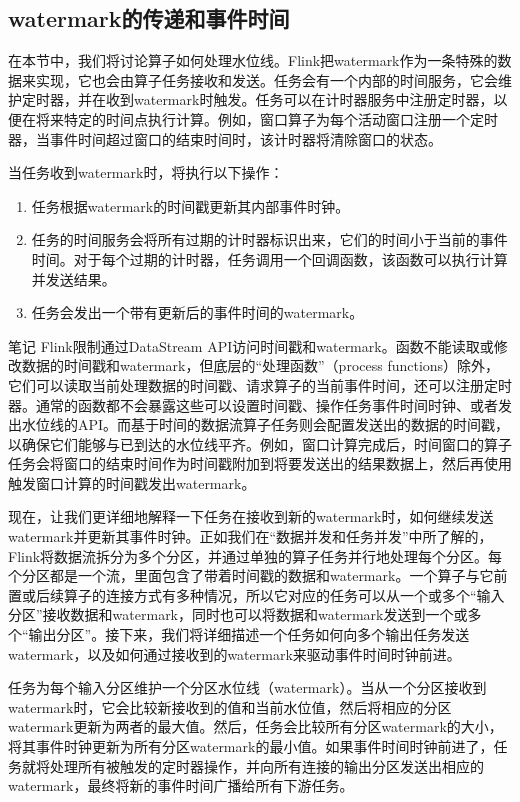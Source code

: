 \documentclass[oneside]{ctexbook}
\begin{document}
\subsection{watermark的传递和事件时间}

在本节中，我们将讨论算子如何处理水位线。Flink把watermark作为一条特殊的数据来实现，它也会由算子任务接收和发送。任务会有一个内部的时间服务，它会维护定时器，并在收到watermark时触发。任务可以在计时器服务中注册定时器，以便在将来特定的时间点执行计算。例如，窗口算子为每个活动窗口注册一个定时器，当事件时间超过窗口的结束时间时，该计时器将清除窗口的状态。

当任务收到watermark时，将执行以下操作：

\begin{enumerate}
  \item 任务根据watermark的时间戳更新其内部事件时钟。
  \item 任务的时间服务会将所有过期的计时器标识出来，它们的时间小于当前的事件时间。对于每个过期的计时器，任务调用一个回调函数，该函数可以执行计算并发送结果。
  \item 任务会发出一个带有更新后的事件时间的watermark。
\end{enumerate}

\begin{bclogo}[logo=\bcinfo, couleurBarre=orange, noborder=true, couleur=white]{笔记}
Flink限制通过DataStream API访问时间戳和watermark。函数不能读取或修改数据的时间戳和watermark，但底层的“处理函数”（process functions）除外，它们可以读取当前处理数据的时间戳、请求算子的当前事件时间，还可以注册定时器。通常的函数都不会暴露这些可以设置时间戳、操作任务事件时间时钟、或者发出水位线的API。而基于时间的数据流算子任务则会配置发送出的数据的时间戳，以确保它们能够与已到达的水位线平齐。例如，窗口计算完成后，时间窗口的算子任务会将窗口的结束时间作为时间戳附加到将要发送出的结果数据上，然后再使用触发窗口计算的时间戳发出watermark。
\end{bclogo}

现在，让我们更详细地解释一下任务在接收到新的watermark时，如何继续发送watermark并更新其事件时钟。正如我们在“数据并发和任务并发”中所了解的，Flink将数据流拆分为多个分区，并通过单独的算子任务并行地处理每个分区。每个分区都是一个流，里面包含了带着时间戳的数据和watermark。一个算子与它前置或后续算子的连接方式有多种情况，所以它对应的任务可以从一个或多个“输入分区”接收数据和watermark，同时也可以将数据和watermark发送到一个或多个“输出分区”。接下来，我们将详细描述一个任务如何向多个输出任务发送watermark，以及如何通过接收到的watermark来驱动事件时间时钟前进。

任务为每个输入分区维护一个分区水位线（watermark）。当从一个分区接收到watermark时，它会比较新接收到的值和当前水位值，然后将相应的分区watermark更新为两者的最大值。然后，任务会比较所有分区watermark的大小，将其事件时钟更新为所有分区watermark的最小值。如果事件时间时钟前进了，任务就将处理所有被触发的定时器操作，并向所有连接的输出分区发送出相应的watermark，最终将新的事件时间广播给所有下游任务。
\end{document}
